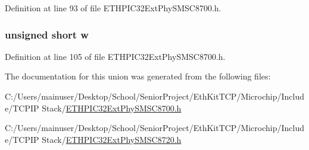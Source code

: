 Definition at line 93 of file E\+T\+H\+P\+I\+C32\+Ext\+Phy\+S\+M\+S\+C8700.\+h.

\hypertarget{union_____m_o_d_e_c_t_r_lbits__t_a160850a4684a3e82c2323033964f2e98}{}
\subsubsection[{w}]{\setlength{\rightskip}{0pt plus 5cm}unsigned short w}\label{union_____m_o_d_e_c_t_r_lbits__t_a160850a4684a3e82c2323033964f2e98}


Definition at line 105 of file E\+T\+H\+P\+I\+C32\+Ext\+Phy\+S\+M\+S\+C8700.\+h.



The documentation for this union was generated from the following files\+:\begin{DoxyCompactItemize}
\item 
C\+:/\+Users/mainuser/\+Desktop/\+School/\+Senior\+Project/\+Eth\+Kit\+T\+C\+P/\+Microchip/\+Include/\+T\+C\+P\+I\+P Stack/\hyperlink{_e_t_h_p_i_c32_ext_phy_s_m_s_c8700_8h}{E\+T\+H\+P\+I\+C32\+Ext\+Phy\+S\+M\+S\+C8700.\+h}\item 
C\+:/\+Users/mainuser/\+Desktop/\+School/\+Senior\+Project/\+Eth\+Kit\+T\+C\+P/\+Microchip/\+Include/\+T\+C\+P\+I\+P Stack/\hyperlink{_e_t_h_p_i_c32_ext_phy_s_m_s_c8720_8h}{E\+T\+H\+P\+I\+C32\+Ext\+Phy\+S\+M\+S\+C8720.\+h}\end{DoxyCompactItemize}
